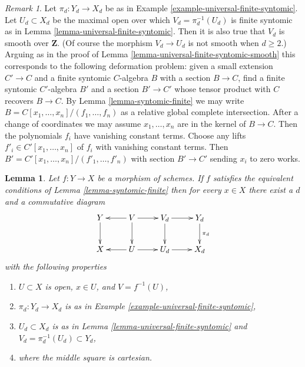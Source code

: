 \documentclass{stacks-project}
\theoremstyle{plain}
\newtheorem{lemma}[subsection]{Lemma}
\theoremstyle{definition}
\theoremstyle{remark}
\newtheorem{remark}[subsection]{Remark}
\numberwithin{equation}{subsection}
\begin{document}
\begin{remark}
\label{remark-universal-finite-syntomic-smooth-top}
Let $\pi_d : Y_d \to X_d$ be as in
Example \ref{example-universal-finite-syntomic}.
Let $U_d \subset X_d$ be the maximal open over which
$V_d = \pi_d^{-1}(U_d)$ is finite syntomic as in
Lemma \ref{lemma-universal-finite-syntomic}.
Then it is also true that $V_d$ is smooth over $\mathbf{Z}$.
(Of course the morphism $V_d \to U_d$ is not smooth when $d \geq 2$.)
Arguing as in the proof of Lemma \ref{lemma-universal-finite-syntomic-smooth}
this corresponds to the following deformation
problem: given a small extension $C' \to C$ and
a finite syntomic $C$-algebra $B$ with a section $B \to C$,
find a finite syntomic $C'$-algebra $B'$ and a section $B' \to C'$
whose tensor product with $C$ recovers $B \to C$.
By Lemma \ref{lemma-syntomic-finite} we may write
$B = C[x_1, \ldots, x_n]/(f_1, \ldots, f_n)$ as
a relative global complete intersection.
After a change of coordinates we may assume
$x_1, \ldots, x_n$ are in the kernel of $B \to C$.
Then the polynomials $f_i$ have vanishing constant terms.
Choose any lifts $f'_i \in C'[x_1, \ldots, x_n]$ of $f_i$
with vanishing constant terms. Then 
$B' = C'[x_1, \ldots, x_n]/(f'_1, \ldots, f'_n)$
with section $B' \to C'$ sending $x_i$ to zero works.
\end{remark}

\begin{lemma}
\label{lemma-locally-comes-from-universal-finite}
Let $f : Y \to X$ be a morphism of schemes. If $f$ satisfies the equivalent
conditions of Lemma \ref{lemma-syntomic-finite} then for every
$x \in X$ there exist a $d$ and a commutative diagram
$$
\xymatrix{
Y \ar[d] &
V \ar[d] \ar[l] \ar[r] &
V_d \ar[d] \ar[r] &
Y_d \ar[d]^{\pi_d}\\
X &
U \ar[l] \ar[r] &
U_d \ar[r] &
X_d
}
$$
with the following properties
\begin{enumerate}
\item $U \subset X$ is open, $x \in U$, and $V = f^{-1}(U)$,
\item $\pi_d : Y_d \to X_d$ is as in
Example \ref{example-universal-finite-syntomic},
\item $U_d \subset X_d$ is as in Lemma \ref{lemma-universal-finite-syntomic}
and $V_d = \pi_d^{-1}(U_d) \subset Y_d$,
\item where the middle square is cartesian.
\end{enumerate}
\end{lemma}
\end{document}
